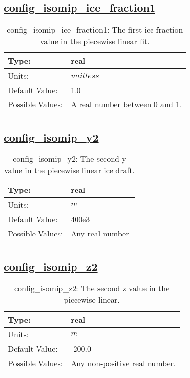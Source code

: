 \subsection[config\_isomip\_ice\_fraction1]{\hyperref[sec:nm_tab_isomip]{config\_isomip\_ice\_fraction1}}
\label{subsec:nm_sec_config_isomip_ice_fraction1}
\begin{center}
\begin{longtable}{| p{2.0in} || p{4.0in} |}
    \hline
    Type: & real \\
    \hline
    Units: & $unitless$ \\
    \hline
    Default Value: & 1.0 \\
    \hline
    Possible Values: & A real number between 0 and 1. \\
    \hline
    \caption{config\_isomip\_ice\_fraction1: The first ice fraction value in the piecewise linear fit.}
\end{longtable}
\end{center}
\subsection[config\_isomip\_y2]{\hyperref[sec:nm_tab_isomip]{config\_isomip\_y2}}
\label{subsec:nm_sec_config_isomip_y2}
\begin{center}
\begin{longtable}{| p{2.0in} || p{4.0in} |}
    \hline
    Type: & real \\
    \hline
    Units: & $m$ \\
    \hline
    Default Value: & 400e3 \\
    \hline
    Possible Values: & Any real number. \\
    \hline
    \caption{config\_isomip\_y2: The second y value in the piecewise linear ice draft.}
\end{longtable}
\end{center}
\subsection[config\_isomip\_z2]{\hyperref[sec:nm_tab_isomip]{config\_isomip\_z2}}
\label{subsec:nm_sec_config_isomip_z2}
\begin{center}
\begin{longtable}{| p{2.0in} || p{4.0in} |}
    \hline
    Type: & real \\
    \hline
    Units: & $m$ \\
    \hline
    Default Value: & -200.0 \\
    \hline
    Possible Values: & Any non-positive real number. \\
    \hline
    \caption{config\_isomip\_z2: The second z value in the piecewise linear.}
\end{longtable}
\end{center}
